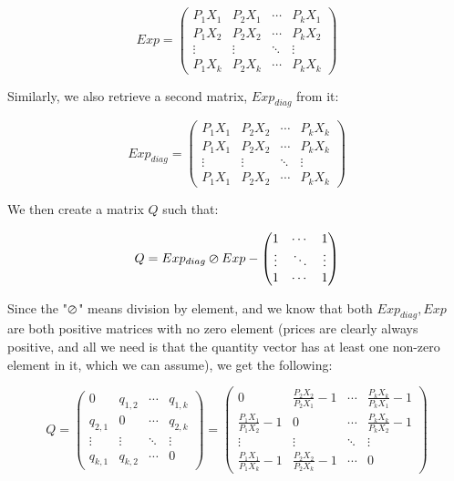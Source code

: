 \documentclass{article} %
\begin{document}
\[
Exp = 
 \begin{pmatrix}
  P_1X_1 & P_2X_1 & \cdots & P_kX_1 \\
  P_1X_2 & P_2X_2 & \cdots & P_kX_2 \\
  \vdots  & \vdots  & \ddots & \vdots  \\
  P_1X_k & P_2X_k & \cdots & P_kX_k
 \end{pmatrix}
\]

Similarly, we also retrieve a second matrix, $Exp_{diag}$ from it:

\[
Exp_{diag} = 
 \begin{pmatrix}
  P_1X_1 & P_2X_2 & \cdots & P_kX_k \\
  P_1X_1 & P_2X_2 & \cdots & P_kX_k \\
  \vdots  & \vdots  & \ddots & \vdots  \\
  P_1X_1 & P_2X_2 & \cdots & P_kX_k
 \end{pmatrix}
\]

We then create a matrix $Q$ such that:

\[
Q = Exp_{diag} \varoslash Exp - 
 \begin{pmatrix}
  1 & \cdots & 1 \\
  \vdots & \ddots & \vdots \\
  1 & \cdots & 1
 \end{pmatrix}
\]

Since the "$\varoslash$" means division by element, and we know that both $Exp_{diag}, Exp$ are both positive matrices with no zero element (prices are clearly always positive, and all we need is that the quantity vector has at least one non-zero element in it, which we can assume), we get the following:

\[
Q = 
 \begin{pmatrix}
  0 & q_{1,2} & \cdots & q_{1,k} \\
  q_{2,1} & 0 & \cdots & q_{2,k} \\
  \vdots & \vdots & \ddots & \vdots \\
  q_{k,1} & q_{k,2} & \cdots & 0
 \end{pmatrix} =
 \begin{pmatrix}
 0 & \frac{P_2X_2}{P_2X_1}-1 & \cdots & \frac{P_kX_k}{P_kX_1}-1 \\[6pt]
 \frac{P_1X_1}{P_1X_2}-1 & 0 & \cdots & \frac{P_kX_k}{P_kX_2}-1 \\[6pt]
 \vdots & \vdots & \ddots & \vdots \\[6pt]
 \frac{P_1X_1}{P_1X_k}-1 & \frac{P_2X_2}{P_2X_k}-1 & \cdots & 0
 \end{pmatrix}
\]
\end{document}
